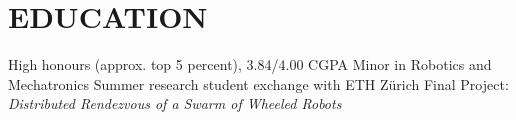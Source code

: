 \documentclass{ResumeTemplate}
\begin{document}
    \hspace{0.025\linewidth}
    \raggedright\begin{minipage}[c]{0.61\linewidth}

        \centering{}
        \vspace{0.75cm}

        \section{EDUCATION}




        \workitemsfour
        {High honours (approx. top 5 percent), 3.84/4.00 CGPA}
        {Minor in Robotics and Mechatronics}
        {Summer research student exchange with ETH Z\"urich}
        {Final Project: \textit{Distributed Rendezvous of a Swarm of Wheeled Robots}}




\end{minipage}
\end{document}
